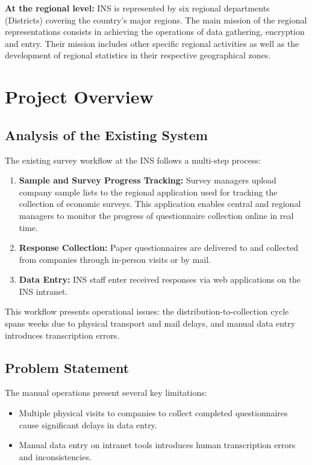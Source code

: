 \documentclass[12pt,a4paper]{report}
\begin{document}
\textbf{At the regional level:} INS is represented by six regional departments (Districts) covering the country's major regions. The main mission of the regional representations consists in achieving the operations of data gathering, encryption and entry. Their mission includes other specific regional activities as well as the development of regional statistics in their respective geographical zones.

\section{Project Overview}

\subsection{Analysis of the Existing System}
The existing survey workflow at the INS follows a multi-step process:
\begin{enumerate}
    \item \textbf{Sample and Survey Progress Tracking:} Survey managers upload company sample lists to the regional application used for tracking the collection of economic surveys. This application enables central and regional managers to monitor the progress of questionnaire collection online in real time.
    \item \textbf{Response Collection:} Paper questionnaires are delivered to and collected from companies through in-person visits or by mail.
    \item \textbf{Data Entry:} INS staff enter received responses via web applications on the INS intranet.
\end{enumerate}

This workflow presents operational issues: the distribution-to-collection cycle spans weeks due to physical transport and mail delays, and manual data entry introduces transcription errors.

\subsection{Problem Statement}
The manual operations present several key limitations:
\begin{itemize}
    \item Multiple physical visits to companies to collect completed questionnaires cause significant delays in data entry.
    \item Manual data entry on intranet tools introduces human transcription errors and inconsistencies.
\end{itemize}
\end{document}
